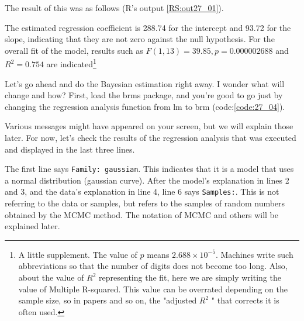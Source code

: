 \documentclass{ltjbook}
\begin{document}
The result of this was as follows (R's output \ref{RS:out27_01}).

The estimated regression coefficient is 288.74 for the intercept and 93.72 for the slope, indicating that they are not zero against the null hypothesis. For the overall fit of the model, results such as $F(1,13)=39.85, p=0.000002688$ and $R^2=0.754$ are indicated\footnote{A little supplement. The value of $p$ means $2.688\times 10^{-5}$. Machines write such abbreviations so that the number of digits does not become too long. Also, about the value of $R^2$ representing the fit, here we are simply writing the value of Multiple R-squared. This value can be overrated depending on the sample size, so in papers and so on, the "adjusted $R^2$ " that corrects it is often used.}

Let's go ahead and do the Bayesian estimation right away. I wonder what will change and how?
First, load the brms package, and you're good to go just by changing the regression analysis function from lm to brm (code:\ref{code:27_04}).



Various messages might have appeared on your screen, but we will explain those later. For now, let's check the results of the regression analysis that was executed and displayed in the last three lines.

The first line says \texttt{Family: gaussian}. This indicates that it is a model that uses a normal distribution (gaussian curve). After the model's explanation in lines 2 and 3, and the data's explanation in line 4, line 6 says \texttt{Samples:}. This is not referring to the data or samples, but refers to the samples of random numbers obtained by the MCMC method. The notation of MCMC and others will be explained later.
\end{document}

